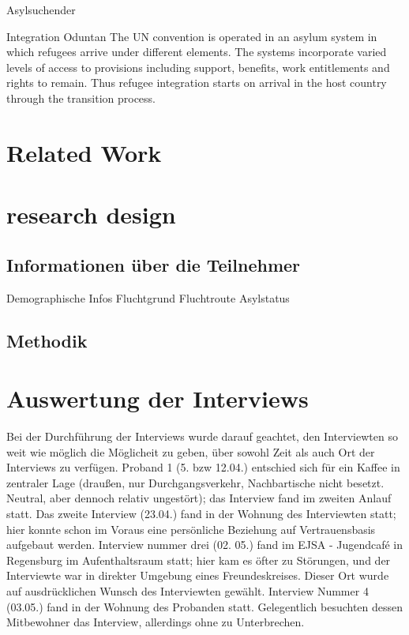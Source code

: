 \documentclass[12pt,oneside]{article}
\begin{document}
Asylsuchender

Integration
Oduntan
The UN convention is operated in an asylum system in
which refugees arrive under different elements. The
systems incorporate varied levels of access to provisions
including support, benefits, work entitlements and rights to
remain. Thus refugee integration starts on arrival in the host
country through the transition process.

\section{Related Work}


\section{research design}

\subsection{Informationen über die Teilnehmer}

Demographische Infos
Fluchtgrund
Fluchtroute
Asylstatus

\subsection{Methodik}

\section{Auswertung der Interviews}

Bei der Durchführung der Interviews wurde darauf geachtet, den Interviewten so weit wie möglich die Möglicheit zu geben, über sowohl Zeit als auch Ort der Interviews zu verfügen. Proband 1 (5. bzw 12.04.) entschied sich für ein Kaffee in zentraler Lage (draußen, nur Durchgangsverkehr, Nachbartische nicht besetzt. Neutral, aber dennoch relativ ungestört); das Interview fand im zweiten Anlauf statt.\newline
Das zweite Interview (23.04.) fand in der Wohnung des Interviewten statt; hier konnte schon im Voraus eine persönliche Beziehung auf Vertrauensbasis aufgebaut werden.
Interview nummer drei (02. 05.) fand im EJSA - Jugendcafé in Regensburg im Aufenthaltsraum statt; hier kam es öfter zu Störungen, und der Interviewte war in direkter Umgebung eines Freundeskreises. Dieser Ort wurde auf ausdrücklichen Wunsch des Interviewten gewählt.
Interview Nummer 4 (03.05.) fand in der Wohnung des Probanden statt. Gelegentlich besuchten dessen Mitbewohner das Interview, allerdings ohne zu Unterbrechen. 
\end{document}
